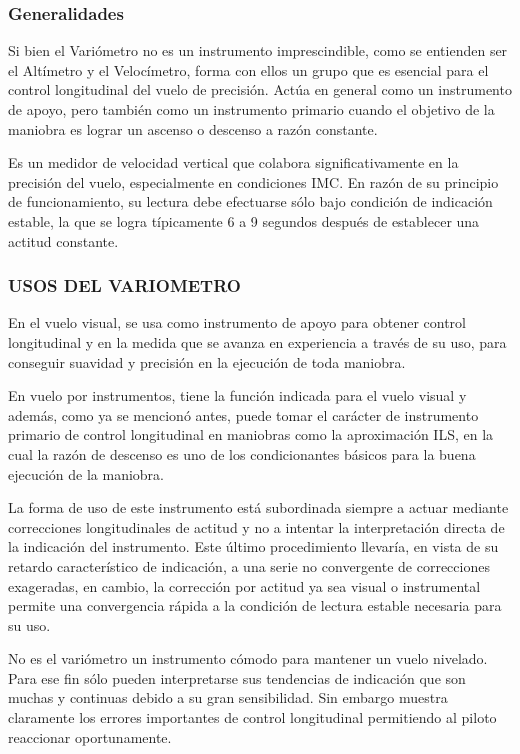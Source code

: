 \documentclass{article}
\begin{document}
\subsubsection*{Generalidades}
Si bien el Variómetro no es un instrumento imprescindible, como se entienden ser el Altímetro y el Velocímetro, forma con ellos un grupo que es esencial para el control longitudinal del vuelo de precisión. Actúa en general como un instrumento de apoyo, pero también como un instrumento primario cuando el objetivo de la maniobra es lograr un ascenso o descenso a razón constante.

Es un medidor de velocidad vertical que colabora significativamente en la precisión del vuelo, especialmente en condiciones IMC.
En razón de su principio de funcionamiento, su lectura debe efectuarse sólo bajo condición de indicación estable, la que se logra típicamente 6 a 9 segundos después de establecer una actitud constante.

\subsubsection*{USOS DEL VARIOMETRO}
En el vuelo visual, se usa como instrumento de apoyo para obtener control longitudinal y en la medida que se avanza en experiencia a través de su uso, para conseguir suavidad y precisión en la ejecución de toda maniobra.

En vuelo por instrumentos, tiene la función indicada para el vuelo visual y además, como ya se mencionó antes, puede tomar el carácter de instrumento primario de control longitudinal en maniobras como la aproximación ILS, en la cual la razón de descenso es uno de los condicionantes básicos para la buena ejecución de la maniobra.

La forma de uso de este instrumento está subordinada siempre a actuar mediante correcciones longitudinales de actitud y no a intentar la interpretación directa de la indicación del instrumento. Este último procedimiento llevaría, en vista de su retardo característico de indicación, a una serie no convergente de correcciones exageradas, en cambio, la corrección por actitud ya sea visual o instrumental permite una convergencia rápida a la condición de lectura estable necesaria para su uso.

No es el variómetro un instrumento cómodo para mantener un vuelo nivelado. Para ese fin sólo pueden interpretarse sus tendencias de indicación que son muchas y continuas debido a su gran sensibilidad. Sin embargo muestra claramente los errores importantes de control longitudinal permitiendo al piloto reaccionar oportunamente.
\end{document}
